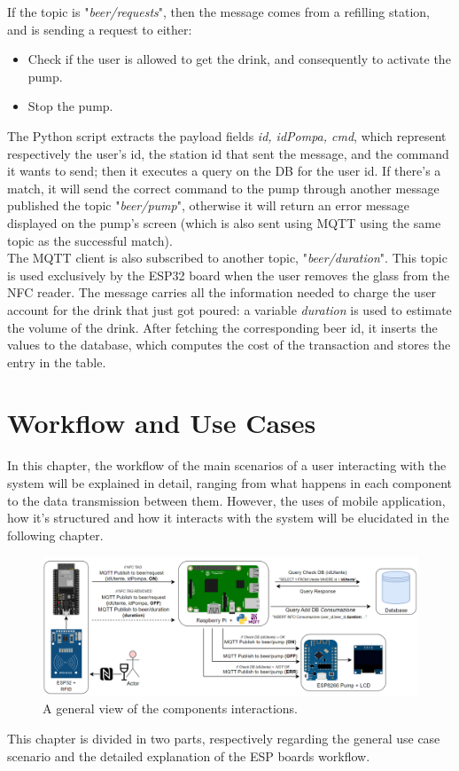 \documentclass[target=bach,aauheader=,style=]{thud}
\begin{document}
If the topic is "\emph{beer/requests}", then the message comes from a refilling station, and is sending a request to either:
\begin{itemize}
	\item Check if the user is allowed to get the drink, and consequently to activate the pump.
	\item Stop the pump.
\end{itemize} 
The Python script extracts the payload fields \emph{id, idPompa, cmd}, which represent respectively the user's id, the station id that sent the message, and the command it wants to send; then it executes a query on the DB for the user id.
If there's a match, it will send the correct command to the pump through another message published the topic "\emph{beer/pump}", otherwise it will return an error message displayed on the pump's screen (which is also sent using MQTT using the same topic as the successful match).\\

The MQTT client is also subscribed to another topic, "\emph{beer/duration}". This topic is used exclusively by the ESP32 board when the user removes the glass from the NFC reader. The message carries all the information needed to charge the user account for the drink that just got poured: a variable \emph{duration} is used to estimate the volume of the drink. After fetching the corresponding beer id, it inserts the values to the database, which computes the cost of the transaction and stores the entry in the table.




\chapter{Workflow and Use Cases}
In this chapter, the workflow of the main scenarios of a user interacting with the system will be explained in detail, ranging from what happens in each component to the data transmission between them. However, the uses of mobile application, how it's structured and how it interacts with the system will be elucidated in the following chapter.\\

\begin{figure}[h!]
	\centering
	\includegraphics[width=1.05\textwidth]{flow}
	\caption{A general view of the components interactions.}
	\label{fig:flow}
\end{figure} 
This chapter is divided in two parts, respectively regarding the general use case scenario and the detailed explanation of the ESP boards workflow.
\newpage
\end{document}
